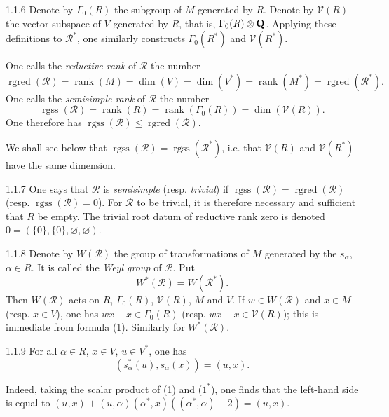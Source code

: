 \begin{definition}{1.1.6}\label{XXI.1.1.6}
Denote by $\Gamma_0(R)$ the subgroup of $M$ generated by $R$. Denote by $\mathcal V(R)$ the vector subspace of $V$ generated by $R$, that is, $\Gamma_0(R)\otimes\mathbf{Q}$. Applying these definitions to $\mathcal R^*$, one similarly constructs $\Gamma_0(R^*)$ and $\mathcal V(R^*)$.

One calls the \emph{reductive rank} of $\mathcal R$ the number
\[
\operatorname{rgred}(\mathcal R)=\operatorname{rank}(M)=\dim(V)=\dim(V^*)=\operatorname{rank}(M^*)=\operatorname{rgred}(\mathcal R^*).
\]
One calls the \emph{semisimple rank} of $\mathcal R$ the number
\[
\operatorname{rgss}(\mathcal R)=\operatorname{rank}(R)=\operatorname{rank}(\Gamma_0(R))=\dim(\mathcal V(R)).
\]
One therefore has $\operatorname{rgss}(\mathcal R)\leq\operatorname{rgred}(\mathcal R)$.

We shall see below that $\operatorname{rgss}(\mathcal R)=\operatorname{rgss}(\mathcal R^*)$, i.e. that $\mathcal V(R)$ and $\mathcal V(R^*)$ have the same dimension.
\end{definition}
\begin{definition}{1.1.7}\label{XXI.1.1.7}
One says that $\mathcal R$ is \emph{semisimple} (resp. \emph{trivial}) if $\operatorname{rgss}(\mathcal R)=\operatorname{rgred}(\mathcal R)$ (resp. $\operatorname{rgss}(\mathcal R)=0$). For $\mathcal R$ to be trivial, it is therefore necessary and sufficient that $R$ be empty. The trivial root datum of reductive rank zero is denoted $0=(\{0\},\{0\},\varnothing,\varnothing)$.
\end{definition}

\begin{definition}{1.1.8}\label{XXI.1.1.8}
Denote by $W(\mathcal R)$ the group of transformations of $M$ generated by the $s_\alpha$, $\alpha\in R$. It is called the \emph{Weyl group} of $\mathcal R$. Put
\[
W^*(\mathcal R)=W(\mathcal R^*).
\]
Then $W(\mathcal R)$ acts on $R$, $\Gamma_0(R)$, $\mathcal V(R)$, $M$ and $V$. If $w\in W(\mathcal R)$ and $x\in M$ (resp. $x\in V$), one has $wx-x\in\Gamma_0(R)$ (resp. $wx-x\in\mathcal V(R)$); this is immediate from formula (1). Similarly for $W^*(\mathcal R)$.
\end{definition}

\begin{lemma}{1.1.9}\label{XXI.1.1.9}
For all $\alpha\in R$, $x\in V$, $u\in V^*$, one has
\begin{equation}\tag{4}\label{XXI.eq.4}
(s_\alpha^*(u),s_\alpha(x))=(u,x).
\end{equation}
\end{lemma}
Indeed, taking the scalar product of (1) and ($1^*$), one finds that the left-hand side is equal to $(u,x)+(u,\alpha)(\alpha^*,x)((\alpha^*,\alpha)-2)=(u,x)$.

